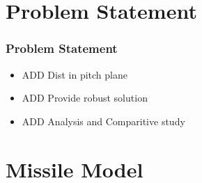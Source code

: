 \documentclass[table,10pt,red]{beamer}	%
\begin{document}
\section{Problem Statement} %
\begin{frame}
	\frametitle{Problem Statement}
 	\begin{itemize}  %
		\item ADD Dist in pitch plane %
		\item ADD Provide robust solution %
		\item ADD Analysis and Comparitive study %
	\end{itemize}
\end{frame}
\section{Missile Model} %
\end{document}
